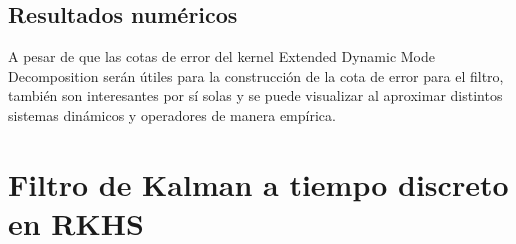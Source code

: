 \subsection{Resultados numéricos}

A pesar de que las cotas de error del kernel Extended Dynamic Mode Decomposition serán útiles para la construcción de la cota de error para el filtro, también son interesantes por sí solas y se puede visualizar al aproximar distintos sistemas dinámicos y operadores de manera empírica.



\section{Filtro de Kalman a tiempo discreto en RKHS}


